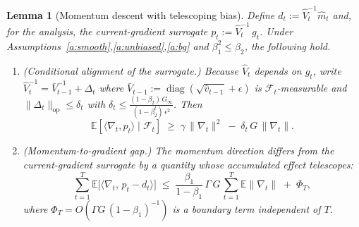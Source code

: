 \documentclass[11pt]{article}
\newtheorem{lemma}{Lemma}
\begin{document}
\begin{lemma}[Momentum descent with telescoping bias]\label{lem:mom}
Define $d_t:=\hat V_t^{-1}\hat m_t$ and, for the analysis, the
\emph{current-gradient surrogate} $p_t:=\hat V_t^{-1}\,g_t$.
Under Assumptions~\ref{a:smooth},\ref{a:unbiased},\ref{a:bg} and $\beta_1^2\le\beta_2$,
the following hold.
\begin{enumerate}
\item[(i)] (Conditional alignment of the surrogate.) Because $\hat V_t$ depends on
$g_t$, write $\hat V_t^{-1}=\bar V_{t-1}^{-1}+\Delta_t$ where
$\bar V_{t-1}:=\operatorname{diag}(\sqrt{\hat v_{t-1}}+\epsilon)$ is
$\mathcal F_t$-measurable and $\|\Delta_t\|_{\mathrm{op}}\le \delta_t$ with
$\delta_t\le \frac{(1-\beta_2)\,G_\infty}{(1-\beta_2^t)\,\epsilon^2}$. Then
\[
\mathbb{E}[\langle\nabla_t,p_t\rangle\mid\mathcal F_t]
\;\ge\;\gamma\,\|\nabla_t\|^2 \;-\; \delta_t\,G\,\|\nabla_t\| .
\]
\item[(ii)] (Momentum-to-gradient gap.) The momentum direction differs from the
current-gradient surrogate by a quantity whose accumulated effect telescopes:
\[
\sum_{t=1}^T \mathbb{E}\big[\langle\nabla_t,\, p_t-d_t\rangle\big]
\;\le\; \frac{\beta_1}{1-\beta_1}\,\Gamma\,G\,
\sum_{t=1}^{T}\mathbb{E}\|\nabla_t\| \;+\; \Phi_T,
\]
where $\Phi_T=O(\Gamma G\,(1-\beta_1)^{-1})$ is a boundary term independent of $T$.
\end{enumerate}
\end{lemma}
\end{document}
